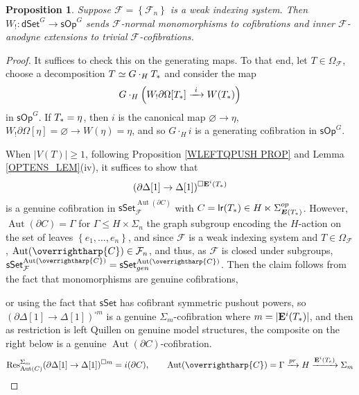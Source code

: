 \documentclass[a4paper,10pt
,draft
]{article}%
\numberwithin{equation}{section}
\numberwithin{figure}{section}
\newtheorem{proposition}[equation]{Proposition}%
\theoremstyle{definition} %
\newcommand{\set}[1]{\left\{#1\right\}}%
\newcommand{\vect}[1]{\text{\overrightharp{\ensuremath{#1}}}}
\newcommand{\sSet}{\ensuremath{\mathsf{sSet}}}%
\newcommand{\sOp}{\ensuremath{\mathsf{sOp}}}%
\newcommand{\dSet}{\mathsf{dSet}}
\DeclareMathOperator{\Aut}{Aut}%
\newcommand{\F}{\ensuremath{\mathcal F}}
\newcommand{\1}{\ensuremath{\mathbbm 1}}%
\begin{document}
\begin{proposition}
      \label{W!_COF_PROP}
      Suppose $\F = \set{\F_n}$ is a weak indexing system.
      Then $W_!: \dSet^G \to \sOp^G$ sends $\F$-normal monomorphisms to cofibrations and inner $\F$-anodyne extensions to trivial $\F$-cofibrations.
\end{proposition}
\begin{proof}
      It suffices to check this on the generating maps.
      To that end, let $T \in \Omega_\F$, choose a decomposition $T \simeq G \cdot_H T_{\**}$ and consider the map
       \begin{equation}
            G \cdot_H \left( W_! \partial \Omega[T_{\**}] \xrightarrow{\ i \ } W(T_{\**}) \right)      
      \end{equation}
      in $\sOp^G$.
      If $T_{\**} = \eta$, then $i$ is the canonical map $\varnothing \to \eta$,
      $W_! \partial \Omega[\eta] = \varnothing \to W(\eta) = \eta$,
      and so $G \cdot_H i$ is a generating cofibration in $\sOp^G$.
      
      When $|V(T)| \geq 1$, following Proposition \ref{WLEFTQPUSH PROP} and Lemma \ref{OPTENS_LEM}(iv),
      it suffices to show that
      \[
            (\partial \Delta[1] \to \Delta[1])^{\square \mathbf E^i(T_{\**})}
      \]
      is a genuine cofibration in $\sSet^{\Aut(\partial C)}_\F$ with $C = \mathsf{lr}(T_{\**}) \in H \ltimes \Sigma_{\boldsymbol{E}(T_{\**})}^{op}$.
      However, $\Aut(\partial C) = \Gamma$ for $\Gamma \leq H \times \Sigma_n$ the graph subgroup encoding the $H$-action on the set of leaves $\set{e_1, \dots, e_n}$,
      and since $\F$ is a weak indexing system and $T \in \Omega_\F$,
      $\Aut(\vect C) \in \F_n$,
      and thus, as $\F$ is closed under subgroups, $\sSet^{\Aut(\vect C)}_\F = \sSet^{\Aut(\vect C)}_{gen}$.
      Then the claim follows from the fact that monomorphisms are genuine cofibrations,
      {\color{OliveGreen} %
        or using the fact that $\sSet$ has cofibrant symmetric pushout powers,
        so $(\partial \Delta[1] \to \Delta[1])^{\square m}$ is a genuine $\Sigma_m$-cofibration where $m = |\mathbf E^i(T_{\**})|$,
        and then as restriction is left Quillen on genuine model structures,
        the composite on the right below is a genuine $\Aut(\partial C)$-cofibration.
        \[
              \mathrm{Res}^{\Sigma_m}_{\Aut(C)}(\partial \Delta[1] \to \Delta[1])^{\square m} = i(\partial C),
              \qquad
              \Aut(\vect C) = \Gamma \xrightarrow{pr} H \xrightarrow{\mathbf E^i(T_e)} \Sigma_m
        \]

}
\end{proof}
\end{document}
